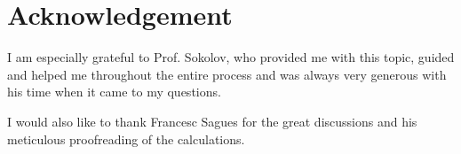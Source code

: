 
\chapter*{Acknowledgement}

I am especially grateful to Prof. Sokolov, who provided me with this topic, guided and helped me throughout the entire process and was always very generous with his time when it came to my questions.

I would also like to thank Francesc Sagues for the great discussions and his meticulous proofreading of the calculations.

